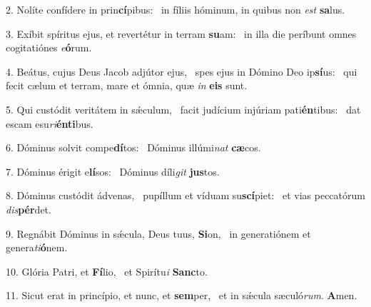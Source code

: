 2. Nolíte confídere in prin\textbf{cí}pibus: \ast\  in fíliis hóminum, in quibus non \textit{est} \textbf{sa}lus.\

3. Exíbit spíritus ejus, et revertétur in terram \textbf{su}am: \ast\  in illa die períbunt omnes cogitatiónes \textit{e}\textbf{ó}rum.\

4. Beátus, cujus Deus Jacob adjútor ejus, \dag\  spes ejus in Dómino Deo ip\textbf{sí}us: \ast\  qui fecit cælum et terram, mare et ómnia, quæ \textit{in} \textbf{e}\textbf{is} sunt.\

5. Qui custódit veritátem in sǽculum, \dag\  facit judícium injúriam pati\textbf{én}tibus: \ast\  dat escam esu\textit{ri}\textbf{én}\textbf{ti}bus.\

6. Dóminus solvit compe\textbf{dí}tos: \ast\  Dóminus illúmi\textit{nat} \textbf{cæ}cos.\

7. Dóminus érigit e\textbf{lí}sos: \ast\  Dóminus díli\textit{git} \textbf{jus}tos.\

8. Dóminus custódit ádvenas, \dag\  pupíllum et víduam su\textbf{scí}piet: \ast\  et vias peccatórum \textit{dis}\textbf{pér}det.\

9. Regnábit Dóminus in sǽcula, Deus tuus, \textbf{Si}on, \ast\  in generatiónem et genera\textit{ti}\textbf{ó}nem.\

10. Glória Patri, et \textbf{Fí}lio, \ast\  et Spirítu\textit{i} \textbf{Sanc}to.\

11. Sicut erat in princípio, et nunc, et \textbf{sem}per, \ast\  et in sǽcula sæculó\textit{rum}. \textbf{A}men.\

